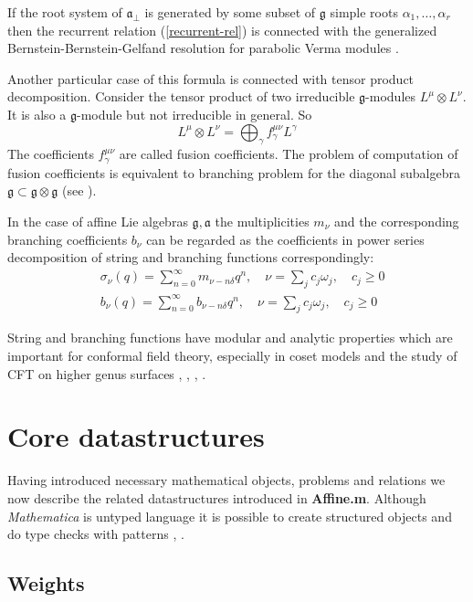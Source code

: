 \documentclass[preprint,12pt]{elsarticle}
\newcommand{\gf}{\mathfrak{g}}
\newcommand{\af}{\mathfrak{a}}
\newcommand{\afb}{\mathfrak{a}_{\bot}}
\begin{document}
If the root system of $\afb$ is generated by some subset of $\gf$
simple roots $\alpha_{1},\dots,\alpha_{r}$ then the recurrent
relation (\ref{recurrent-rel}) is connected with the generalized
Bernstein-Bernstein-Gelfand resolution for parabolic Verma modules
\cite{2011arXiv1102.1702L}.

Another particular case of this formula is connected with tensor
product decomposition. Consider the tensor product of two
irreducible $\gf$-modules $L^{\mu}\otimes L^{\nu}$. It is also a
$\gf$-module but not irreducible in general. So
\begin{equation}
  \label{eq:19}
  L^{\mu}\otimes L^{\nu}=\bigoplus_{\gamma} f^{\mu\nu}_{\gamma}L^{\gamma}
\end{equation}
The coefficients $f^{\mu\nu}_{\gamma}$ are called fusion
coefficients. The problem of computation of fusion coefficients is
equivalent to branching problem for the diagonal subalgebra
$\gf\subset \gf\otimes \gf$ (see \cite{LyakhovskyPostnova2011}).

In the case of affine Lie algebras $\gf, \af$  the multiplicities
$m_{\nu}$ and the corresponding branching coefficients $b_{\nu}$
can be regarded as the coefficients in power series decomposition
of string and branching functions correspondingly:
\begin{align}
  \label{eq:21}
  &\sigma_{\nu}(q)=\sum_{n=0}^{\infty} m_{\nu-n\delta} q^n, \quad \nu=\sum_j c_j \omega_j,\quad c_j\geq 0\\
  & b_{\nu}(q)=\sum_{n=0}^{\infty} b_{\nu-n\delta} q^n,\quad  \nu=\sum_j c_j \omega_j, \quad c_j\geq 0
\end{align}

String and branching functions have  modular and analytic properties which are important for conformal field theory, especially in  coset models and the study of CFT on higher genus surfaces \cite{kac1988modular}, \cite{difrancesco1997cft}, \cite{Walton:1999xc}, \cite{walton1989conformal}. 

\section{Core datastructures}
\label{sec:core-datastructures} Having introduced necessary
mathematical objects, problems and relations we now describe the
related datastructures introduced in {\bf Affine.m}. Although {\it
Mathematica} is untyped language it is possible to create
structured objects and do type checks with patterns
\cite{shifrinmathematica}, \cite{maeder2000computer}.
\subsection{Weights}
\label{sec:weights}
\end{document}
